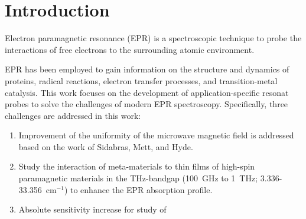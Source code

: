 \chapter[Introduction]{Introduction}


    
Electron paramagnetic resonance (EPR) is a spectroscopic technique to probe the interactions of free electrons to the surrounding atomic environment. 

EPR has been employed to gain information on the structure and dynamics of proteins, radical reactions, electron transfer processes, and transition-metal catalysis. This work focuses on the development of application-specific resonat probes to solve the challenges of modern EPR spectroscopy. Specifically, three challenges are addressed in this work: 
\begin{enumerate}
\setlength\itemsep{-0.25em}
    \item Improvement of the uniformity of the microwave magnetic field is addressed based on the work of Sidabras, Mett, and Hyde. \cite{HydeUFRev2019}
    \item Study the interaction of meta-materials to thin films of high-spin paramagnetic materials in the THz-bandgap (100~GHz to 1~THz; 3.336-33.356~cm$^{-1}$) to enhance the EPR absorption profile.
    \item Absolute sensitivity increase for study of 
\end{enumerate}  


